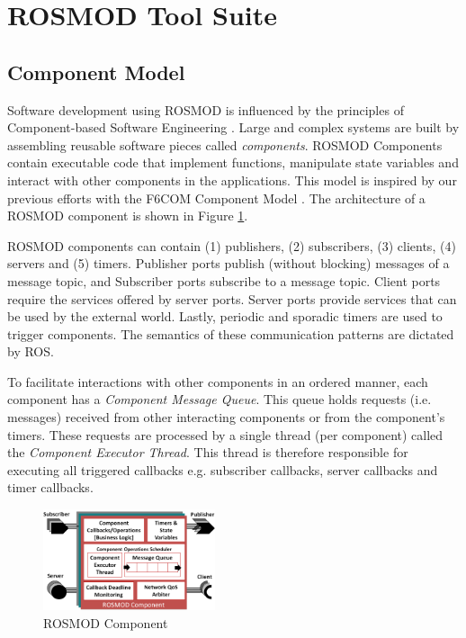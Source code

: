 \section{ROSMOD Tool Suite}
\label{sec:ROSMOD}

\subsection{Component Model}

Software development using ROSMOD is influenced by the principles of Component-based Software Engineering
\cite{CBSE}\cite{Heineman:01}. Large and complex systems are built by assembling reusable software pieces called \emph{components}. ROSMOD Components contain executable code that implement functions, manipulate state variables and interact with other components in the applications. This model is inspired by our previous efforts with the F6COM Component Model \cite{DREMS_CM}. The architecture of a ROSMOD component is shown in Figure \ref{fig:ROSMOD_Component}.

ROSMOD components can contain (1) publishers, (2) subscribers, (3) clients, (4) servers and (5) timers. Publisher ports publish (without blocking) messages of a message topic, and Subscriber ports subscribe to a message topic. Client ports require the services offered by server ports. Server ports provide services that can be used by the external world. Lastly, periodic and sporadic timers are used to trigger components. The semantics of these communication patterns are dictated by ROS.

To facilitate interactions with other components in an ordered manner, each component has a \emph{Component Message Queue}. This queue holds requests (i.e. messages) received from other interacting components or from the component's timers. %
These requests are processed by a single thread (per component) called the \emph{Component Executor Thread}. This thread is therefore responsible for executing all triggered callbacks e.g. subscriber callbacks, server callbacks and timer callbacks. 

\begin{figure}[h]
	\centering
	\includegraphics[width=0.45\textwidth]{figs/ROSMOD_Component.png}
	\caption{ROSMOD Component}
	\label{fig:ROSMOD_Component}
\end{figure}

